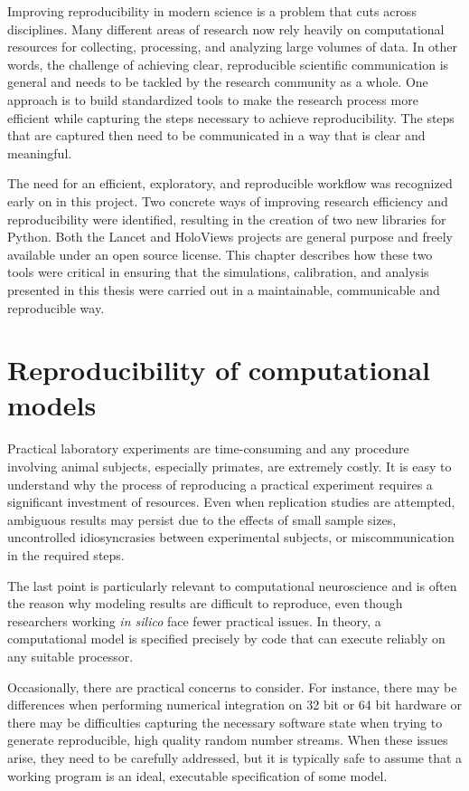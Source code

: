 \documentclass[phd,ianc,twoside]{infthesis}
\begin{document}
Improving reproducibility in modern science is a problem that cuts
across disciplines. Many different areas of research now rely heavily on
computational resources for collecting, processing, and analyzing large
volumes of data. In other words, the challenge of achieving clear,
reproducible scientific communication is general and needs to be tackled
by the research community as a whole. One approach is to build
standardized tools to make the research process more efficient while
capturing the steps necessary to achieve reproducibility. The steps that
are captured then need to be communicated in a way that is clear and
meaningful.

The need for an efficient, exploratory, and reproducible workflow was
recognized early on in this project. Two concrete ways of improving
research efficiency and reproducibility were identified, resulting in
the creation of two new libraries for Python. Both the Lancet and
HoloViews projects are general purpose and freely available under an
open source license. This chapter describes how these two tools were
critical in ensuring that the simulations, calibration, and analysis
presented in this thesis were carried out in a maintainable,
communicable and reproducible way.

\section{Reproducibility of computational models}

Practical laboratory experiments are time-consuming and any procedure
involving animal subjects, especially primates, are extremely costly. It
is easy to understand why the process of reproducing a practical
experiment requires a significant investment of resources. Even when
replication studies are attempted, ambiguous results may persist due to
the effects of small sample sizes, uncontrolled idiosyncrasies between
experimental subjects, or miscommunication in the required steps.

The last point is particularly relevant to computational neuroscience
and is often the reason why modeling results are difficult to reproduce,
even though researchers working \emph{in silico} face fewer practical
issues. In theory, a computational model is specified precisely by code
that can execute reliably on any suitable processor.

Occasionally, there are practical concerns to consider. For instance,
there may be differences when performing numerical integration on 32 bit
or 64 bit hardware or there may be difficulties capturing the necessary
software state when trying to generate reproducible, high quality random
number streams. When these issues arise, they need to be carefully
addressed, but it is typically safe to assume that a working program is
an ideal, executable specification of some model.
\end{document}
